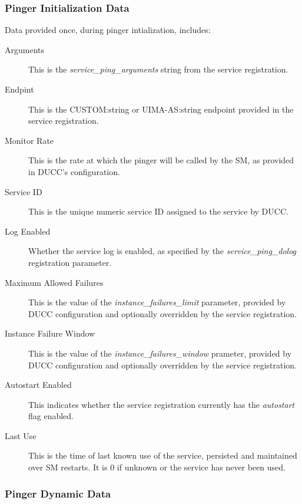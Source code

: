       \subsubsection{Pinger Initialization Data}
      Data provided once, during pinger intialization, includes:
      \begin{description}
        \item[Arguments] This is the {\em service\_ping\_arguments} string from the
          service registration.
        \item[Endpint] This is the CUSTOM:string or UIMA-AS:string endpoint provided
          in the service registration.
        \item[Monitor Rate] This is the rate at which the pinger will be called by
          the SM, as provided in DUCC's configuration.
        \item[Service ID] This is the unique numeric service ID assigned to the service
          by DUCC.
        \item[Log Enabled] Whether the service log is enabled, as specified by the
          {\em service\_ping\_dolog} registration parameter.
        \item[Maximum Allowed Failures] This is the value of the {\em instance\_failures\_limit}
          parameter, provided by DUCC configuration and optionally overridden by the
          service registration.
        \item[Instance Failure Window] This is the value of the {\em instance\_failures\_window}
          prameter, provided by DUCC configuration and optionally overridden by the
          service registration.
        \item[Autostart Enabled] This indicates whether the service registration currently
          has the {\em autostart} flag enabled.
        \item[Last Use] This is the time of last known use of the service, persisted and
          maintained over SM restarts.  It is 0 if unknown or the service has never been
              used.
      \end{description}
        
      \subsubsection{Pinger Dynamic Data}

